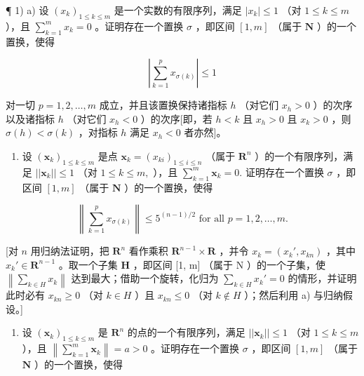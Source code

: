 \ExerciseSection

¶ 1) a) 设 \((x_{k})_{1\leqslant k\leqslant m}\) 是一个实数的有限序列，满足 \(|x_k|\leqslant 1\) （对 \(1\leqslant k\leqslant m\) ），且 \(\sum_{k = 1}^{m}x_{k} = 0\) 。证明存在一个置换 \(\sigma\) ，即区间 \([1,m]\) （属于 \(\mathbf{N}\) ）的一个置换，使得

\[
\left| \sum_ {k = 1} ^ {p} x _ {\sigma (k)} \right| \leqslant 1
\]

对一切 \(p = 1, 2, \ldots, m\) 成立，并且该置换保持诸指标 \(h\) （对它们 \(x_h > 0\) ）的次序以及诸指标 \(h\) （对它们 \(x_h < 0\) ）的次序{[}即，若 \(h < k\) 且 \(x_h > 0\) 且 \(x_k > 0\) ，则 \(\sigma(h) < \sigma(k)\) ，对指标 \(h\) 满足 \(x_h < 0\) 者亦然{]}。

\begin{enumerate}
\def\labelenumi{\alph{enumi})}
\setcounter{enumi}{1}
\tightlist
\item
  设 \((\pmb{x}_k)_{1\leqslant k\leqslant m}\) 是点 \(\pmb{x}_k = (x_{ki})_{1\leqslant i\leqslant n}\) （属于 \(\mathbf{R}^n\) ）的一个有限序列，满足 \(||\pmb{x}_k||\leqslant 1\) （对 \(1\leqslant k\leqslant m,\) ），且 \(\sum_{k = 1}^{m}\pmb{x}_k = 0.\) 证明存在一个置换 \(\sigma\) ，即区间 \([1, m]\) （属于 \(\mathbf{N}\) ）的一个置换，使得
\end{enumerate}

\[
\left\| \sum_ {k = 1} ^ {p} x _ {\sigma (k)} \right\| \leqslant 5 ^ {(n - 1) / 2} \text { for   all } p = 1, 2, \dots , m.
\]

{[}对 \(n\) 用归纳法证明，把 \(\mathbf{R}^n\) 看作乘积 \(\mathbf{R}^{n-1} \times \mathbf{R}\) ，并令 \(x_k = (x_k', x_{kn})\) ，其中 \(x_k' \in \mathbf{R}^{n-1}\) 。取一个子集 \(\mathbf{H}\) ，即区间 {[}1, m{]} （属于 N ）的一个子集，使 \(\left\|\sum_{k\in H}x_{k}\right\|\) 达到最大；借助一个旋转，化归为 \(\sum_{k\in H}x_{k}'=0\) 的情形，并证明此时必有 \(x_{kn}\geqslant0\) （对 \(k\in H\) ）且 \(x_{kn}\leqslant0\) （对 \(k\notin H\) ）；然后利用 a) 与归纳假设。{]}

\begin{enumerate}
\def\labelenumi{\alph{enumi})}
\setcounter{enumi}{2}
\tightlist
\item
  设 \((\pmb{x}_k)_{1 \leqslant k \leqslant m}\) 是 \(\mathbf{R}^n\) 的点的一个有限序列，满足 \(||\pmb{x}_k|| \leqslant 1\) （对 \(1 \leqslant k \leqslant m\) ），且 \(\left\| \sum_{k=1}^{m} \pmb{x}_k \right\| = a > 0\) 。证明存在一个置换 \(\sigma\) ，即区间 \([1, m]\) （属于 \(\mathbf{N}\) ）的一个置换，使得
\end{enumerate}

